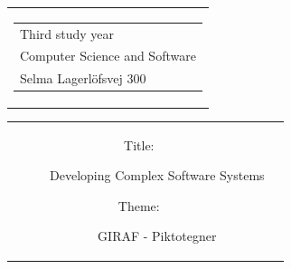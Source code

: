 

\thispagestyle{empty}
\begin{titlingpage}
 \begin{nopagebreak}
 {\samepage 
 \begin{tabular}{r}
\parbox{\textwidth}{  
 \hfill \parbox{4.9cm}{\begin{tabular}{l}
{\textsf\small \textsf{Third study year}}\\
{\textsf\small \textsf{Computer Science and Software}} \\
{\textsf\small \textsf{Selma Lagerlöfsvej 300}} \\
 \end{tabular}}
}
\end{tabular}

 \begin{tabular}{cc}
\parbox{7cm}{
\begin{description}

\item[Title:]

Developing Complex Software Systems
  
 \item[Theme:]

GIRAF - Piktotegner

 \end{description}

\parbox{8cm}{

}}
\end{tabular}}
\end{nopagebreak}
\end{titlingpage}
